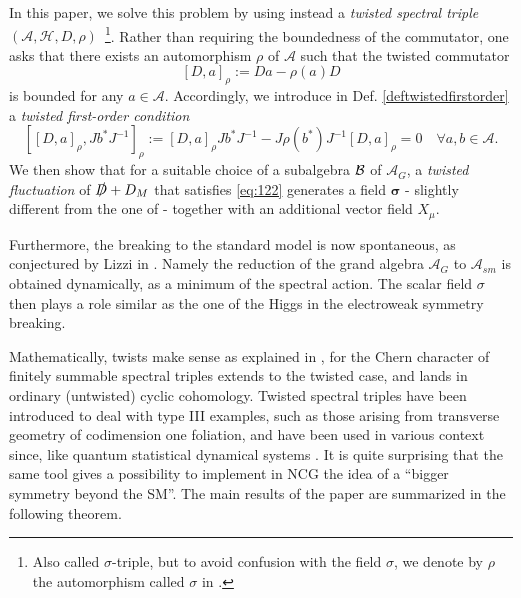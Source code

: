 \documentclass[11pt]{article}
\newcommand{\A}{\mathcal A}
\newcommand{\HH}{\mathcal H}
\newcommand{\Ds}{\slashed D}
\newcommand{\sig}{{\boldsymbol{\sigma}}}
\begin{document}
In this paper, we solve this problem by using instead a
\emph{twisted spectral triple} $(\A, \HH, D,
\rho)$~\cite{Connes:1938fk}{\footnote{Also called
    $\sigma$-triple, but to avoid confusion with the field $\sigma$,
    we denote by $\rho$ the automorphism called $\sigma$ in \cite{Connes:1938fk}.}}. Rather than requiring the boundedness of the commutator,
one asks that there exists an automorphism $\rho$ of $\A$ such that the
twisted commutator 
\begin{equation}
  \label{eq:113}
 [D, a]_\rho :=  D a - \rho(a)D
\end{equation}
is bounded for any $a\in\A$. Accordingly, we introduce in Def. \ref{deftwistedfirstorder} 
a \emph{twisted first-order condition}
\begin{equation}
  \label{eq:122}
  [[D,a]_\rho, Jb^*J^{-1}]_\rho :=  [D,a]_\rho Jb^*J^{-1} -
  J\rho(b^*)J^{-1}[D,a]_\rho = 0 \quad \forall a,b\in \A.
\end{equation}
We then show that for a suitable choice of a subalgebra $\cal B$ of
$\A_G$, a \emph{twisted fluctuation}
of $\Ds +D_M$
that satisfies \eqref{eq:122} generates a field $\sig$ - slightly different
from the one of \cite{Chamseddine:2012fk} - together with an
additional  vector field $X_\mu$.

Furthermore, the breaking to the standard model is now spontaneous, as conjectured by Lizzi in
\cite{Devastato:2013fk}. Namely the reduction of the grand
algebra $\A_G$ to $\A_{sm}$ is obtained dynamically, as a minimum of the spectral
action. The scalar field $\sigma$ then plays a role similar as the one of the
Higgs in the electroweak symmetry breaking.

Mathematically, twists make sense as explained in
  \cite{Connes:1938fk},  for the
  Chern character of finitely summable spectral triples extends to the
  twisted case, and lands in ordinary (untwisted) cyclic
  cohomology. Twisted spectral triples have been introduced to deal
  with type III examples, such as those arising from transverse
  geometry of codimension one foliation, and have been used in
    various context since, like quantum statistical dynamical systems
    \cite{Greenfield:2014aa}. It is quite surprising that the same
    tool gives a possibility to implement in NCG the idea of a ``bigger symmetry beyond the SM''.
The main results of the paper are summarized in the following theorem.
\end{document}
